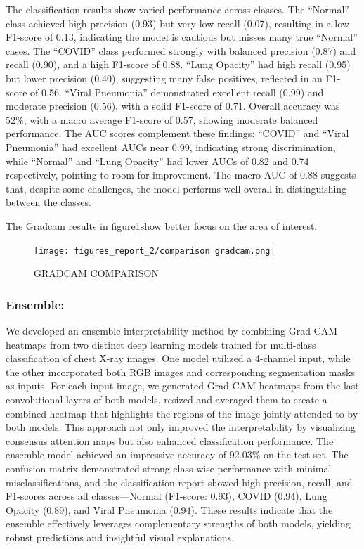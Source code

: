 \documentclass{article}
\begin{document}
The classification results show varied performance across classes. The “Normal” class achieved high precision (0.93) but very low recall (0.07), resulting in a low F1-score of 0.13, indicating the model is cautious but misses many true “Normal” cases. The “COVID” class performed strongly with balanced precision (0.87) and recall (0.90), and a high F1-score of 0.88. “Lung Opacity” had high recall (0.95) but lower precision (0.40), suggesting many false positives, reflected in an F1-score of 0.56. “Viral Pneumonia” demonstrated excellent recall (0.99) and moderate precision (0.56), with a solid F1-score of 0.71. Overall accuracy was 52\%, with a macro average F1-score of 0.57, showing moderate balanced performance. The AUC scores complement these findings: “COVID” and “Viral Pneumonia” had excellent AUCs near 0.99, indicating strong discrimination, while “Normal” and “Lung Opacity” had lower AUCs of 0.82 and 0.74 respectively, pointing to room for improvement. The macro AUC of 0.88 suggests that, despite some challenges, the model performs well overall in distinguishing between the classes.

The Gradcam results in figure\ref{figures_report_2/comparison gradcam.png}show better focus on the area of interest.
\begin{figure}[ht] %
    \centering
    \texttt{[image: figures\_report\_2/comparison gradcam.png]}
    \caption{GRADCAM COMPARISON}
    \label{figures_report_2/comparison gradcam.png}
\end{figure}


\subsubsection{Ensemble:}
We developed an ensemble interpretability method by combining Grad-CAM heatmaps from two distinct deep learning models trained for multi-class classification of chest X-ray images. One model utilized a 4-channel input, while the other incorporated both RGB images and corresponding segmentation masks as inputs. For each input image, we generated Grad-CAM heatmaps from the last convolutional layers of both models, resized and averaged them to create a combined heatmap that highlights the regions of the image jointly attended to by both models. This approach not only improved the interpretability by visualizing consensus attention maps but also enhanced classification performance. The ensemble model achieved an impressive accuracy of 92.03\% on the test set. The confusion matrix demonstrated strong class-wise performance with minimal misclassifications, and the classification report showed high precision, recall, and F1-scores across all classes—Normal (F1-score: 0.93), COVID (0.94), Lung Opacity (0.89), and Viral Pneumonia (0.94). These results indicate that the ensemble effectively leverages complementary strengths of both models, yielding robust predictions and insightful visual explanations.
\end{document}
